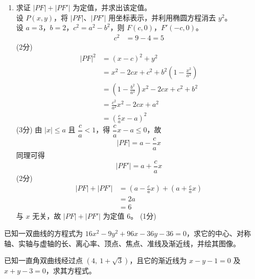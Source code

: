 \documentclass[12pt,a4paper]{exam-zh}
\newcommand{\qscore}[1]{%
    \unskip\nobreak\hfill
    \makebox[0pt][l]{\makebox[4em][r]{(#1\%)}}%
}
\begin{document}
\begin{solution}
\begin{enumerate}[label=(\alph*),leftmargin=2.4em,itemsep=1em,topsep=0.5em,parsep=0.25em]
        \item 求证 $|PF|+|PF'|$ 为定值，并求出该定值。 \\
        设 $P(x,y)$，将 $|PF|$、$|PF'|$ 用坐标表示，并利用椭圆方程消去 $y^2$。 \\
        设 $a=3$，$b=2$，$c^2=a^2-b^2$，则 $F(c,0)$，$F'(-c,0)$。
        \begin{align*}
            c^2 &= 9-4 = 5
        \end{align*}
        \hfill (2分)
        \begin{align*}
            |PF|^2 &= (x-c)^2+y^2 \\
            &= x^2-2cx+c^2+b^2\left(1-\frac{x^2}{a^2}\right) \\
            &= \left(1-\frac{b^2}{a^2}\right)x^2 -2cx+c^2+b^2 \\
            &= \frac{c^2}{a^2}x^2-2cx+a^2 \\
            &= \left(\frac{c}{a}x-a\right)^2
        \end{align*}
        \hfill (3分)
        由 $|x|\le a$ 且 $\dfrac{c}{a}<1$，得 $\dfrac{c}{a}x-a\le 0$，故
        \[
            |PF| = a-\frac{c}{a}x
        \]
        同理可得
        \[
            |PF'| = a+\frac{c}{a}x
        \]
        \hfill (2分)
        \begin{align*}
            |PF|+|PF'| &= \left(a-\frac{c}{a}x\right)+\left(a+\frac{c}{a}x\right) \\
            &= 2a \\
            &= 6
        \end{align*}
        与 $x$ 无关，故 $|PF|+|PF'|$ 为定值 $6$。
        \hfill (1分)
    \end{enumerate}
\end{solution}

\begin{question}[points = 10]
    \begin{questionparts}
        \item 已知一双曲线的方程式为 $16x^2-9y^2+96x-36y-36=0$，求它的中心、对称轴、实轴与虚轴的长、离心率、顶点、焦点、准线及渐近线，并绘其图像。 \qscore{8}

        \item 已知一直角双曲线经过点 $\left(4,\ 1+\sqrt{3}\right)$，且它的渐近线为 $x-y-1=0$ 及 $x+y-3=0$，求其方程式。 \qscore{4}
    \end{questionparts}
\end{question}
\end{document}
